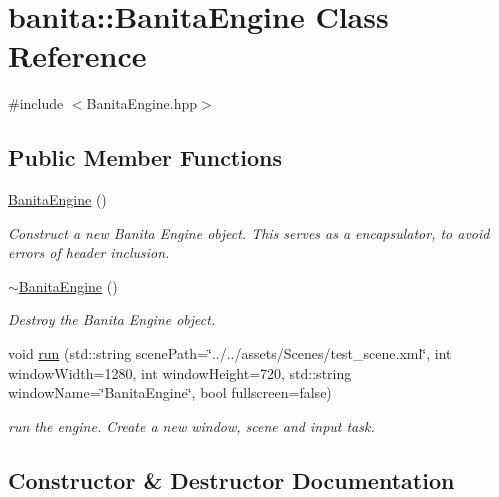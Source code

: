 \hypertarget{classbanita_1_1_banita_engine}{}\section{banita\+::Banita\+Engine Class Reference}
\label{classbanita_1_1_banita_engine}


{\ttfamily \#include $<$Banita\+Engine.\+hpp$>$}

\subsection*{Public Member Functions}
\begin{DoxyCompactItemize}
\item 
\mbox{\hyperlink{classbanita_1_1_banita_engine_abdb08737880ae46f671e0780251ea4c4}{Banita\+Engine}} ()
\begin{DoxyCompactList}\small\item\em Construct a new Banita Engine object. This serves as a encapsulator, to avoid errors of header inclusion. \end{DoxyCompactList}\item 
\mbox{\hyperlink{classbanita_1_1_banita_engine_a9bd490383a9a8baaed3a2b4a3d8c7bcc}{$\sim$\+Banita\+Engine}} ()
\begin{DoxyCompactList}\small\item\em Destroy the Banita Engine object. \end{DoxyCompactList}\item 
void \mbox{\hyperlink{classbanita_1_1_banita_engine_ac2b3d79609be0bad75ec9ed6b5b3cd1f}{run}} (std\+::string scene\+Path=\char`\"{}../../assets/Scenes/test\+\_\+scene.\+xml\char`\"{}, int window\+Width=1280, int window\+Height=720, std\+::string window\+Name=\char`\"{}Banita\+Engine\char`\"{}, bool fullscreen=false)
\begin{DoxyCompactList}\small\item\em run the engine. Create a new window, scene and input task. \end{DoxyCompactList}\end{DoxyCompactItemize}


\subsection{Constructor \& Destructor Documentation}
\mbox{\label{classbanita_1_1_banita_engine_abdb08737880ae46f671e0780251ea4c4}} 
